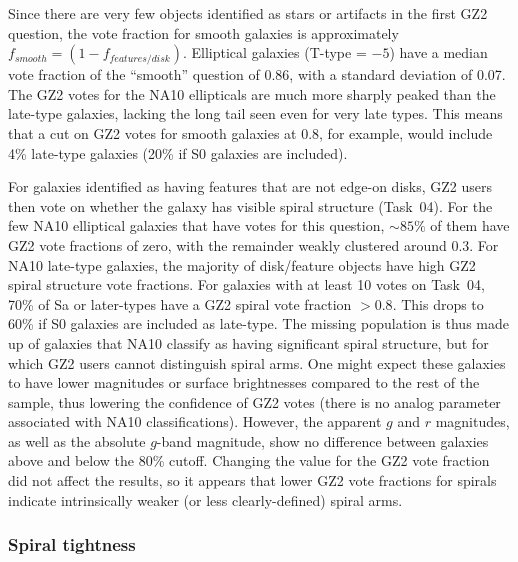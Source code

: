 \documentclass[useAMS,usenatbib]{mn2e}
\begin{document}
Since there are very few objects identified as stars or artifacts in the first GZ2 question, the vote fraction for smooth galaxies is approximately $f_{smooth} = (1 - f_{features/disk})$. Elliptical galaxies (T-type = $-5$) have a median vote fraction of the ``smooth'' question of 0.86, with a standard deviation of 0.07. The GZ2 votes for the NA10 ellipticals are much more sharply peaked than the late-type galaxies, lacking the long tail seen even for very late types. This means that a cut on GZ2 votes for smooth galaxies at 0.8, for example, would include 4\% late-type galaxies (20\% if S0 galaxies are included). 

For galaxies identified as having features that are not edge-on disks, GZ2 users then vote on whether the galaxy has visible spiral structure (Task~04). For the few NA10 elliptical galaxies that have votes for this question, $\sim85\%$ of them have GZ2 vote fractions of zero, with the remainder weakly clustered around 0.3. For NA10 late-type galaxies, the majority of disk/feature objects have high GZ2 spiral structure vote fractions. For galaxies with at least 10 votes on Task~04, 70\% of Sa or later-types have a GZ2 spiral vote fraction $>0.8$. This drops to 60\% if S0 galaxies are included as late-type. The missing population is thus made up of galaxies that NA10 classify as having significant spiral structure, but for which GZ2 users cannot distinguish spiral arms. One might expect these galaxies to have lower magnitudes or surface brightnesses compared to the rest of the sample, thus lowering the confidence of GZ2 votes (there is no analog parameter associated with NA10 classifications). However, the apparent $g$ and $r$ magnitudes, as well as the absolute $g$-band magnitude, show no difference between galaxies above and below the 80\% cutoff. Changing the value for the GZ2 vote fraction did not affect the results, so it appears that lower GZ2 vote fractions for spirals indicate intrinsically weaker (or less clearly-defined) spiral arms.

\subsubsection{Spiral tightness}
\end{document}
